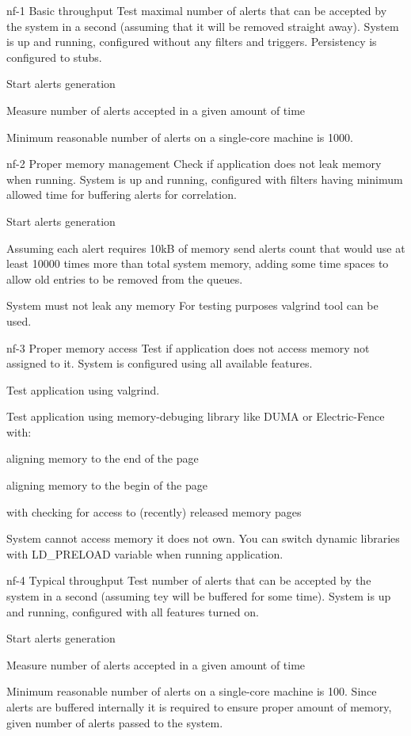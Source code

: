 \testCase
{nf-1}
{Basic throughput}
{Test maximal number of alerts that can be accepted by the system in a second (assuming that it will be removed straight away).}
{System is up and running, configured without any filters and triggers. Persistency is configured to stubs.}
{
\begin{enumerate*}
\item{Start alerts generation}
\item{Measure number of alerts accepted in a given amount of time}
\end{enumerate*}
}
{Minimum reasonable number of alerts on a single-core machine is 1000.}
{}


\testCase
{nf-2}
{Proper memory management}
{Check if application does not leak memory when running.}
{System is up and running, configured with filters having minimum allowed time for buffering alerts for correlation.}
{
\begin{enumerate*}
\item{Start alerts generation}
\item{Assuming each alert requires 10kB of memory send alerts count that would use at least 10000 times more than total system memory, adding some time spaces to allow old entries to be removed from the queues.}
\end{enumerate*}
}
{System must not leak any memory}
{For testing purposes valgrind tool can be used.}


\testCase
{nf-3}
{Proper memory access}
{Test if application does not access memory not assigned to it.}
{System is configured using all available features.}
{
\begin{enumerate*}
\item{Test application using valgrind.}
\item{Test application using memory-debuging library like DUMA or Electric-Fence with:}
  \begin{enumerate*}
  \item aligning memory to the end of the page
  \item aligning memory to the begin of the page
  \item with checking for access to (recently) released memory pages
  \end{enumerate*}
\end{enumerate*}
}
{System cannot access memory it does not own.}
{You can switch dynamic libraries with LD\_PRELOAD variable when running application.}


\testCase
{nf-4}
{Typical throughput}
{Test number of alerts that can be accepted by the system in a second (assuming tey will be buffered for some time).}
{System is up and running, configured with all features turned on.}
{
\begin{enumerate*}
\item{Start alerts generation}
\item{Measure number of alerts accepted in a given amount of time}
\end{enumerate*}
}
{Minimum reasonable number of alerts on a single-core machine is 100.}
{Since alerts are buffered internally it is required to ensure proper amount of memory, given number of alerts passed to the system.}
